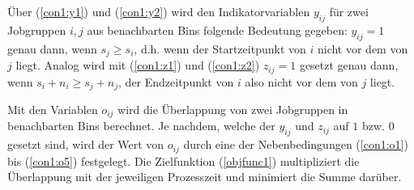 \documentclass{scrreprt}
\begin{document}
Über (\ref{con1:y1}) und (\ref{con1:y2}) wird den Indikatorvariablen $y_{ij}$ für
zwei Jobgruppen $i,j$ aus benachbarten Bins folgende
Bedeutung gegeben: $y_{ij}=1$ genau dann, wenn $s_j \geq s_i$, d.h. wenn der Startzeitpunkt von $i$ nicht vor dem von $j$ liegt.
Analog wird mit (\ref{con1:z1}) und (\ref{con1:z2}) $z_{ij}=1$ gesetzt genau dann, wenn $s_i+n_i \geq s_j+n_j$, der Endzeitpunkt von $i$ also nicht vor dem von $j$ liegt.

Mit den Variablen $o_{ij}$ wird die Überlappung von zwei Jobgruppen in benachbarten Bins berechnet.
Je nachdem, welche der $y_{ij}$ und $z_{ij}$ auf $1$ bzw. $0$ gesetzt sind, 
wird der Wert von $o_{ij}$ durch eine der Nebenbedingungen (\ref{con1:o1}) bis (\ref{con1:o5}) festgelegt.
Die Zielfunktion (\ref{objfunc1}) multipliziert die Überlappung mit der jeweiligen Prozesszeit und minimiert die Summe darüber.
\end{document}
